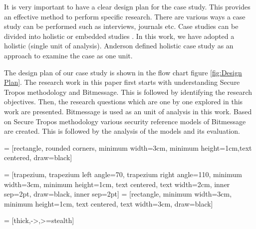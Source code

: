 \documentclass{acm_proc_article-sp}
\begin{document}
\par
It is very important to have a clear design plan for the case study. This provides an effective method to perform specific research. There are various ways a case study can be performed such as interviews, journals etc. Case studies can be divided into holistic or embedded studies \cite{37844699}. In this work, we have adopted a holistic (single unit of analysis). Anderson \cite{37844699} defined holistic case study as an approach to examine the case as one unit.
\par
The design plan of our case study is shown in the flow chart figure \ref{fig:Design Plan}. The research work in this paper first starts with understanding Secure Tropos methodology and Bitmessage. This is followed by identifying the research objectives. Then, the research questions which are one by one explored in this work are presented. Bitmessage is used as an unit of analysis in this work. Based on Secure Tropos methodology various security reference models of Bitmessage are created. This is followed by the analysis of the models and its evaluation.

 = [rectangle, rounded corners, minimum width=3cm, minimum height=1cm,text centered, draw=black]

 = [trapezium, trapezium left angle=70, trapezium right angle=110, minimum width=3cm, minimum height=1cm, text centered, text width=2cm, inner sep=2pt, draw=black, inner sep=2pt]
 = [rectangle, minimum width=3cm, minimum height=1cm, text centered, text width=3cm, draw=black]

 = [thick,->,>=stealth]
\end{document}
